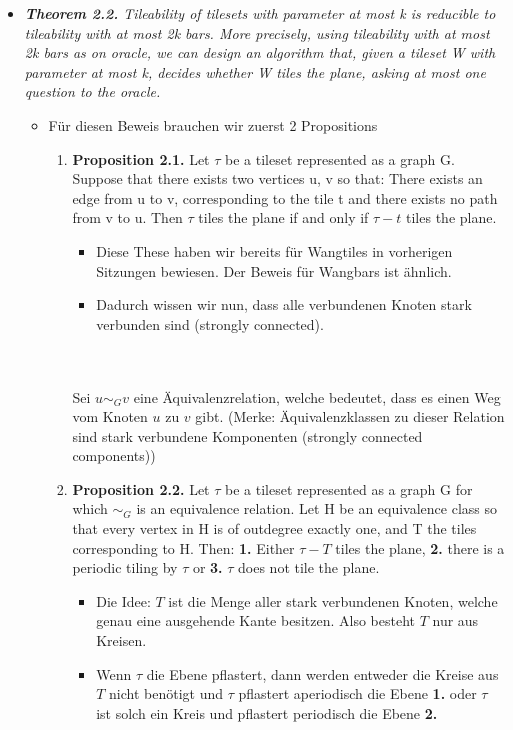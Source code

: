 \begin{itemize}
    \item {\itshape \textbf{Theorem 2.2.} Tileability of tilesets with parameter at most k is reducible to tileability with at most 2k bars. More precisely, using tileability with at most 2k bars as on oracle, we can design an algorithm that, given a tileset W with parameter at most k, decides whether W tiles the plane, asking at most one question to the oracle.}
    \begin{itemize}
        \item Für diesen Beweis brauchen wir zuerst 2 Propositions
        \begin{enumerate}
            \item \textbf{Proposition 2.1.} Let $\tau$ be a tileset represented as a graph G. Suppose that there exists two vertices u, v so that: There exists an edge from u to v, corresponding to the tile t and there exists no path from v to u. Then $\tau$ tiles the plane if and only if $\tau - {t}$ tiles the plane.
            \begin{itemize}
                \item Diese These haben wir bereits für Wangtiles in vorherigen Sitzungen bewiesen. Der Beweis für Wangbars ist ähnlich.
                \item Dadurch wissen wir nun, dass alle verbundenen Knoten stark verbunden sind (strongly connected).
            \end{itemize}
            
            \\ \ \\ Sei $u \sim_G v$ eine Äquivalenzrelation, welche bedeutet, dass es einen Weg vom Knoten $u$ zu $v$ gibt. (Merke: Äquivalenzklassen zu dieser Relation sind stark verbundene Komponenten (strongly connected components))
            \item \textbf{Proposition 2.2.} Let $\tau$ be a tileset represented as a graph G for which $\sim_G$ is an equivalence relation. Let H be an equivalence class so that every vertex in H is of outdegree exactly one, and T the tiles corresponding to H. Then: \textbf{1.} Either $\tau - T$ tiles the plane, \textbf{2.} there is a periodic tiling by $\tau$ or \textbf{3.} $\tau$ does not tile the plane.
            \begin{itemize}
                \item Die Idee: $T$ ist die Menge aller stark verbundenen Knoten, welche genau eine ausgehende Kante besitzen. Also besteht $T$ nur aus Kreisen.
                \item Wenn $\tau$ die Ebene pflastert, dann werden entweder die Kreise aus $T$ nicht benötigt und $\tau$ pflastert aperiodisch die Ebene \textbf{1.} oder $\tau$ ist solch ein Kreis und pflastert periodisch die Ebene \textbf{2.}
            \end{itemize}
        \end{enumerate}
        

\end{itemize}
\end{itemize}
